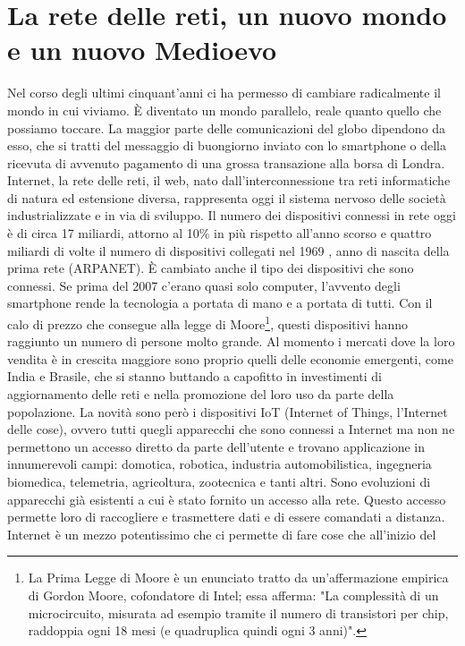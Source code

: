 \chapter{La rete delle reti, un nuovo mondo e un nuovo Medioevo}

Nel corso degli ultimi cinquant’anni ci ha permesso di cambiare radicalmente il mondo in cui
viviamo. È diventato un mondo parallelo, reale quanto quello che possiamo toccare. La
maggior parte delle comunicazioni del globo dipendono da esso, che si tratti del messaggio
di buongiorno inviato con lo smartphone o della ricevuta di avvenuto pagamento di una
grossa transazione alla borsa di Londra. Internet, la rete delle reti, il web, nato
dall’interconnessione tra reti informatiche di natura ed estensione diversa, rappresenta oggi
il sistema nervoso delle società industrializzate e in via di sviluppo. Il numero dei dispositivi
connessi in rete oggi è di circa 17 miliardi, attorno al 10\% in più rispetto all’anno scorso e
quattro miliardi di volte il numero di dispositivi collegati nel 1969 \parencite{lasse}, anno di
nascita della prima rete (ARPANET). È cambiato anche il tipo dei dispositivi che sono
connessi. Se prima del 2007 c’erano quasi solo computer, l’avvento degli smartphone rende
la tecnologia a portata di mano e a portata di tutti. Con il calo di prezzo che consegue alla
legge di Moore\footnote{La Prima Legge di Moore è un enunciato tratto da un'affermazione empirica di Gordon Moore, cofondatore di Intel; essa afferma: "La
complessità di un microcircuito, misurata ad esempio tramite il numero di transistori per chip, raddoppia ogni 18 mesi (e quadruplica
quindi ogni 3 anni)".}, questi dispositivi hanno raggiunto un numero di persone molto grande. Al
momento i mercati dove la loro vendita è in crescita maggiore sono proprio quelli delle
economie emergenti, come India e Brasile, che si stanno buttando a capofitto in investimenti
di aggiornamento delle reti e nella promozione del loro uso da parte della popolazione. La
novità sono però i dispositivi IoT \parencite{lasse} (Internet of Things, l’Internet delle cose),
ovvero tutti quegli apparecchi che sono connessi a Internet ma non ne permettono un
accesso diretto da parte dell’utente e trovano applicazione in innumerevoli campi: domotica,
robotica, industria automobilistica, ingegneria biomedica, telemetria, agricoltura, zootecnica
e tanti altri. Sono evoluzioni di apparecchi già esistenti a cui è stato fornito un accesso alla
rete. Questo accesso permette loro di raccogliere e trasmettere dati e di essere comandati
a distanza. Internet è un mezzo potentissimo che ci permette di fare cose che all’inizio del
